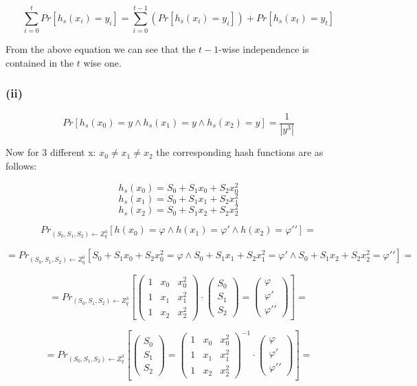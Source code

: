 \documentclass[11pt]{article}
\newcounter{t0d0_counter}
\begin{document}
 $$ \sum_{i=0}^t{Pr[h_s(x_i)=y_i]} = \sum_{i=0}^{t-1}{(Pr[h_s(x_i)=y_i])}+Pr[h_s(x_t)=y_t]$$

 From the above equation we can see that the $t-1$-wise independence is contained in the $t$ wise one. 

 \subsubsection{(ii)} $$ Pr[h_s(x_0)=y \wedge h_s(x_1)=y \wedge h_s(x_2)=y] = \frac{1}{|y^3|} $$
      
Now for 3 different x: $x_0 \neq x_1 \neq x_2$ the corresponding hash functions are as follows:

$$ h_s(x_0) = S_0 + S_1x_0 + S_2x_0^2 $$
$$ h_s(x_1) = S_0 + S_1x_1 + S_2x_1^2 $$
$$ h_s(x_2) = S_0 + S_1x_2 + S_2x_2^2 $$

$$ Pr_{(S_0,S_1,S_2)\gets Z_q^3}[h(x_0)= \varphi \wedge h(x_1)=\varphi \prime \wedge h(x_2)=\varphi \prime \prime]=$$

$$=Pr_{(S_0,S_1,S_2)\gets Z_q^3}[S_0+S_1x_0+S_2x_0^2=\varphi \wedge S_0+S_1x_1+S_2x_1^2=\varphi \prime \wedge S_0+S_1x_2+S_2x_2^2=\varphi \prime \prime]=$$


\[
=Pr_{(S_0,S_1,S_2)\gets Z_q^3}[
\begin{pmatrix}
	1 & x_0 & x_0^2 \\
	1 & x_1 & x_1^2 \\
	1 & x_2 & x_2^2
\end{pmatrix}
\cdot
\begin{pmatrix}
	S_0 \\
	S_1\\
	S_2
\end{pmatrix}
=
\begin{pmatrix}
\varphi \\
\varphi \prime \\
\varphi \prime \prime
\end{pmatrix}
]=
\]

\[
=Pr_{(S_0,S_1,S_2)\gets Z_q^3}[
\begin{pmatrix}
	S_0 \\
	S_1\\
	S_2
\end{pmatrix}
=
\begin{pmatrix}
	1 & x_0 & x_0^2 \\
	1 & x_1 & x_1^2 \\
	1 & x_2 & x_2^2
\end{pmatrix}^{-1}
\cdot
\begin{pmatrix}
\varphi \\
\varphi \prime \\
\varphi \prime \prime
\end{pmatrix}
]=
\]
\end{document}
